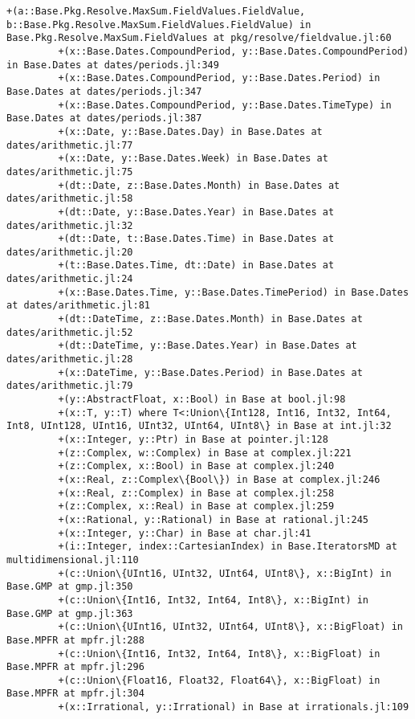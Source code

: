 \documentclass[11pt]{article}
\begin{document}
\begin{Verbatim}[commandchars=\\\{\}]
         +(a::Base.Pkg.Resolve.MaxSum.FieldValues.FieldValue, b::Base.Pkg.Resolve.MaxSum.FieldValues.FieldValue) in Base.Pkg.Resolve.MaxSum.FieldValues at pkg/resolve/fieldvalue.jl:60
         +(x::Base.Dates.CompoundPeriod, y::Base.Dates.CompoundPeriod) in Base.Dates at dates/periods.jl:349
         +(x::Base.Dates.CompoundPeriod, y::Base.Dates.Period) in Base.Dates at dates/periods.jl:347
         +(x::Base.Dates.CompoundPeriod, y::Base.Dates.TimeType) in Base.Dates at dates/periods.jl:387
         +(x::Date, y::Base.Dates.Day) in Base.Dates at dates/arithmetic.jl:77
         +(x::Date, y::Base.Dates.Week) in Base.Dates at dates/arithmetic.jl:75
         +(dt::Date, z::Base.Dates.Month) in Base.Dates at dates/arithmetic.jl:58
         +(dt::Date, y::Base.Dates.Year) in Base.Dates at dates/arithmetic.jl:32
         +(dt::Date, t::Base.Dates.Time) in Base.Dates at dates/arithmetic.jl:20
         +(t::Base.Dates.Time, dt::Date) in Base.Dates at dates/arithmetic.jl:24
         +(x::Base.Dates.Time, y::Base.Dates.TimePeriod) in Base.Dates at dates/arithmetic.jl:81
         +(dt::DateTime, z::Base.Dates.Month) in Base.Dates at dates/arithmetic.jl:52
         +(dt::DateTime, y::Base.Dates.Year) in Base.Dates at dates/arithmetic.jl:28
         +(x::DateTime, y::Base.Dates.Period) in Base.Dates at dates/arithmetic.jl:79
         +(y::AbstractFloat, x::Bool) in Base at bool.jl:98
         +(x::T, y::T) where T<:Union\{Int128, Int16, Int32, Int64, Int8, UInt128, UInt16, UInt32, UInt64, UInt8\} in Base at int.jl:32
         +(x::Integer, y::Ptr) in Base at pointer.jl:128
         +(z::Complex, w::Complex) in Base at complex.jl:221
         +(z::Complex, x::Bool) in Base at complex.jl:240
         +(x::Real, z::Complex\{Bool\}) in Base at complex.jl:246
         +(x::Real, z::Complex) in Base at complex.jl:258
         +(z::Complex, x::Real) in Base at complex.jl:259
         +(x::Rational, y::Rational) in Base at rational.jl:245
         +(x::Integer, y::Char) in Base at char.jl:41
         +(i::Integer, index::CartesianIndex) in Base.IteratorsMD at multidimensional.jl:110
         +(c::Union\{UInt16, UInt32, UInt64, UInt8\}, x::BigInt) in Base.GMP at gmp.jl:350
         +(c::Union\{Int16, Int32, Int64, Int8\}, x::BigInt) in Base.GMP at gmp.jl:363
         +(c::Union\{UInt16, UInt32, UInt64, UInt8\}, x::BigFloat) in Base.MPFR at mpfr.jl:288
         +(c::Union\{Int16, Int32, Int64, Int8\}, x::BigFloat) in Base.MPFR at mpfr.jl:296
         +(c::Union\{Float16, Float32, Float64\}, x::BigFloat) in Base.MPFR at mpfr.jl:304
         +(x::Irrational, y::Irrational) in Base at irrationals.jl:109

\end{Verbatim}
\end{document}
